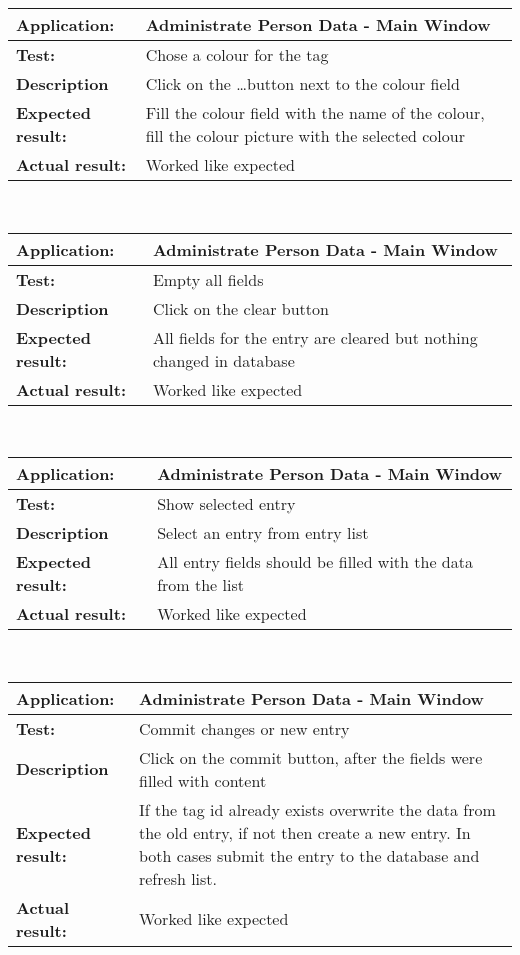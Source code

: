    \begin{tabular}{|p{3.5cm}|p{10.5cm}|}
    \hline
     \textbf{Application:}	& Administrate Person Data - Main Window\\
    \hline
     \textbf{Test:}		& Chose a colour for the tag\\
    \hline
     \textbf{Description}	& Click on the \dots button next to the colour field\\
    \hline
     \textbf{Expected result:}	& Fill the colour field with the name of the colour, fill the colour picture with the selected colour\\
    \hline
     \textbf{Actual result:}	& Worked like expected\\
    \hline
   \end{tabular}\\
   \begin{tabular}{|p{3.5cm}|p{10.5cm}|}
    \hline
     \textbf{Application:}	& Administrate Person Data - Main Window\\
    \hline
     \textbf{Test:}		& Empty all fields\\
    \hline
     \textbf{Description}	& Click on the clear button\\
    \hline
     \textbf{Expected result:}	& All fields for the entry are cleared but nothing changed in database\\
    \hline
     \textbf{Actual result:}	& Worked like expected\\
    \hline
   \end{tabular}\\
   \begin{tabular}{|p{3.5cm}|p{10.5cm}|}
    \hline
     \textbf{Application:}	& Administrate Person Data - Main Window\\
    \hline
     \textbf{Test:}		& Show selected entry\\
    \hline
     \textbf{Description}	& Select an entry from entry list\\
    \hline
     \textbf{Expected result:}	& All entry fields should be filled with the data from the list\\
    \hline
     \textbf{Actual result:}	& Worked like expected\\
    \hline
   \end{tabular}\\
   \begin{tabular}{|p{3.5cm}|p{10.5cm}|}
    \hline
     \textbf{Application:}	& Administrate Person Data - Main Window\\
    \hline
     \textbf{Test:}		& Commit changes or new entry\\
    \hline
     \textbf{Description}	& Click on the commit button, after the fields were filled with content\\
    \hline
     \textbf{Expected result:}	& If the tag id already exists overwrite the data from the old entry, if not then create a new entry. In both cases submit the entry to the database and refresh list.\\
    \hline
     \textbf{Actual result:}	& Worked like expected\\
    \hline
   \end{tabular}

